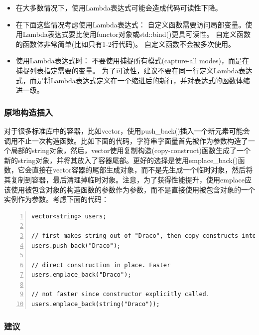 \documentclass{ctexart}
\begin{document}
\begin{itemize}
	\item 在大多数情况下，使用Lambda表达式可能会造成代码可读性下降。
	\item 在下面这些情况考虑使用Lambda表达式：
	\subitem 自定义函数需要访问局部变量。使用Lambda表达式要比使用functor对象或std::bind()更具可读性。
	\subitem 自定义函数的函数体非常简单(比如只有1-2行代码)。
	\subitem 自定义函数不会被多次使用。
	\item 使用Lambda表达式时：
	\subitem 不要使用捕捉所有模式(capture-all modes)，而是在捕捉列表指定需要的变量。
	\subitem 为了可读性，建议不要在同一行定义Lambda表达式，而是将Lambda表达式定义在一个缩进后的新行，并对表达式的函数体缩进一级。
\end{itemize}

\subsubsection{原地构造插入}

对于很多标准库中的容器，比如vector，使用push\_back()插入一个新元素可能会调用不止一次构造函数。比如下面的代码，字符串字面量首先被作为参数构造了一个局部的string对象，然后，vector使用复制构造(copy-construct)函数生成了一个新的string对象，并将其放入了容器尾部。更好的选择是使用emplace\_back()函数，它会直接在vector容器的尾部生成对象，而不是先生成一个临时对象，然后将其复制到容器，最后清理掉临时对象。注意，为了获得性能提升，使用emplace应该使用被包含对象的构造函数的参数作为参数，而不是直接使用被包含对象的一个实例作为参数。考虑下面的代码：

\begin{lstlisting}[language={[ANSI]C},keywordstyle=\color{blue!70},commentstyle=\color{red!50!green!50!blue!50},frame=shadowbox, rulesepcolor=\color{red!20!green!20!blue!20},basicstyle=\small,numbers=left, numberstyle=\tiny,breaklines=true]
vector<string> users;  

// first makes string out of "Draco", then copy constructs into vector. Slower  
users.push_back("Draco");  

// direct construction in place. Faster  
users.emplace_back("Draco");   

// not faster since constructor explicitly called.  
users.emplace_back(string("Draco"));
\end{lstlisting}

\subsubsection*{建议}
\end{document}
